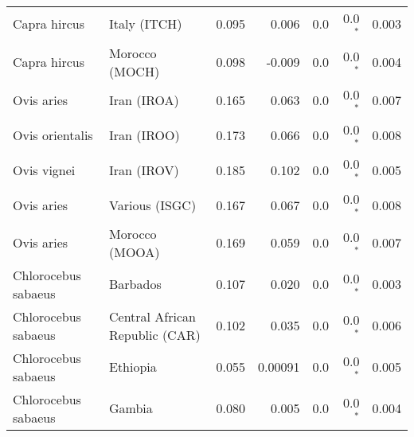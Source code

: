 \begin{center}
\begin{adjustbox}{width = 1\textwidth}
\begin{tabular}{|l|l|r|r|r|r|r|}
        Capra hircus &                    Italy (ITCH) &                 0.095 &                                0.006 &                  0.0 &                             0.0$\bm{^*}$ &              0.003 \\
        Capra hircus &                  Morocco (MOCH) &                 0.098 &                               -0.009 &                  0.0 &                             0.0$\bm{^*}$ &              0.004 \\
          Ovis aries &                     Iran (IROA) &                 0.165 &                                0.063 &                  0.0 &                             0.0$\bm{^*}$ &              0.007 \\
     Ovis orientalis &                     Iran (IROO) &                 0.173 &                                0.066 &                  0.0 &                             0.0$\bm{^*}$ &              0.008 \\
         Ovis vignei &                     Iran (IROV) &                 0.185 &                                0.102 &                  0.0 &                             0.0$\bm{^*}$ &              0.005 \\
          Ovis aries &                  Various (ISGC) &                 0.167 &                                0.067 &                  0.0 &                             0.0$\bm{^*}$ &              0.008 \\
          Ovis aries &                  Morocco (MOOA) &                 0.169 &                                0.059 &                  0.0 &                             0.0$\bm{^*}$ &              0.007 \\
 Chlorocebus sabaeus &                        Barbados &                 0.107 &                                0.020 &                  0.0 &                             0.0$\bm{^*}$ &              0.003 \\
 Chlorocebus sabaeus &  Central African Republic (CAR) &                 0.102 &                                0.035 &                  0.0 &                             0.0$\bm{^*}$ &              0.006 \\
 Chlorocebus sabaeus &                        Ethiopia &                 0.055 &                              0.00091 &                  0.0 &                             0.0$\bm{^*}$ &              0.005 \\
 Chlorocebus sabaeus &                          Gambia &                 0.080 &                                0.005 &                  0.0 &                             0.0$\bm{^*}$ &              0.004 \\

\end{tabular}
\end{adjustbox}
\end{center}
